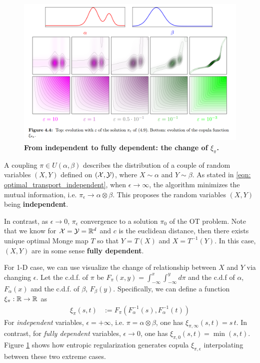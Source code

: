 \documentclass[11pt]{article}
\begin{document}
\begin{figure}
\begin{minipage}[t]{1\linewidth}
  \centering
  \centerline{\includegraphics[scale = 0.4]{xi_epsilon.png}}
\end{minipage}
\caption{\footnotesize{\textbf{From independent to fully dependent: the change of $\xi_{\pi}$.}}}
\label{fig: xi_epsilon}
\end{figure}

A coupling $\pi \in U(\alpha, \beta)$ describes the distribution of a couple of random variables $(X, Y)$ defined on $({\mathcal X}, {\mathcal Y})$, where $X \sim \alpha$ and $Y \sim \beta$. As stated in \eqref{eqn: optimal_transport_independent}, when $\epsilon\rightarrow \infty$, the algorithm minimizes the mutual information, i.e. $\pi_{\epsilon} \rightarrow \alpha \otimes \beta$. This proposes the random variables $(X, Y)$ being \textbf{independent}.  

In contrast, as $\epsilon \rightarrow 0$, $\pi_{\epsilon}$ convergence to a solution $\pi_{0}$ of the OT problem.  Note that we know for ${\mathcal X} = {\mathcal Y} ={\mathbb R}^{d}$ and $c$ is the euclidean distance, then there exists unique optimal Monge map $T$ so that $Y=T(X)$ and $X=T^{-1}(Y)$. In this case, $(X, Y)$ are in some sense \textbf{fully dependent}.

For 1-D case, we can use visualize the change of relationship between $X$ and $Y$ via changing $\epsilon$. Let the c.d.f. of $\pi$ be $F_{\pi}(x, y) = \int_{-\infty}^{x}\int_{-\infty}^{y}d\pi$ and the c.d.f of $\alpha$, $F_{\alpha}(x)$ and the c.d.f. of $\beta$, $F_{\beta}(y)$.  Specifically, we can define a function $\xi_{\pi}: {\mathbb R} \rightarrow {\mathbb R}$ as
\begin{align*}
\xi_{\pi}(s, t) &:= F_{\pi}(F_{\alpha}^{-1}(s), F_{\alpha}^{-1}(t)) 
\end{align*} For \emph{independent} variables, $\epsilon = +\infty$, i.e. $\pi = \alpha \otimes \beta$, one has $\xi_{\pi, \infty}(s,t) = s\,t$. In contrast, for \emph{fully dependent} variables, $\epsilon \rightarrow 0$, one has $\xi_{\pi, 0}(s, t) = \min(s, t)$. Figure \ref{fig: xi_epsilon} shows how entropic regularization generates copula $\xi_{\pi, \epsilon}$ interpolating between these two extreme cases.
\end{document}
